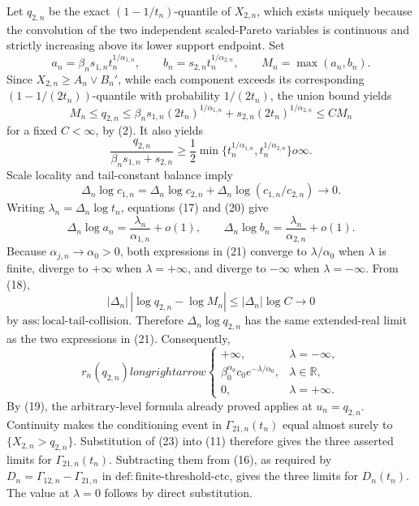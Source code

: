 Let \(q_{2,n}\) be the exact \((1-1/t_n)\)-quantile of \(X_{2,n}\), which exists uniquely because the convolution of the two independent scaled-Pareto variables is continuous and strictly increasing above its lower support endpoint. Set
\[
a_n=\beta_ns_{1,n}t_n^{1/\alpha_{1,n}},
\qquad b_n=s_{2,n}t_n^{1/\alpha_{2,n}},
\qquad M_n=\max(a_n,b_n).
\tag{17}
\]
Since \(X_{2,n}\geq A_n\vee B_n'\), while each component exceeds its corresponding \((1-1/(2t_n))\)-quantile with probability \(1/(2t_n)\), the union bound yields
\[
M_n\leq q_{2,n}
\leq\beta_ns_{1,n}(2t_n)^{1/\alpha_{1,n}}
+s_{2,n}(2t_n)^{1/\alpha_{2,n}}
\leq C M_n
\tag{18}
\]
for a fixed \(C<\infty\), by (2). It also yields
\[
\frac{q_{2,n}}{\beta_ns_{1,n}+s_{2,n}}
\geq\frac12\min\{t_n^{1/\alpha_{1,n}},t_n^{1/\alpha_{2,n}}\}  o\infty.
\tag{19}
\]
Scale locality and tail-constant balance imply
\[
\Delta_n\log c_{1,n}
=\Delta_n\log c_{2,n}+\Delta_n\log(c_{1,n}/c_{2,n})\to0.
\tag{20}
\]
Writing \(\lambda_n=\Delta_n\log t_n\), equations (17) and (20) give
\[
\Delta_n\log a_n=\frac{\lambda_n}{\alpha_{1,n}}+o(1),
\qquad
\Delta_n\log b_n=\frac{\lambda_n}{\alpha_{2,n}}+o(1).
\tag{21}
\]
Because \(\alpha_{j,n}\to\alpha_0>0\), both expressions in (21) converge to \(\lambda/\alpha_0\) when \(\lambda\) is finite, diverge to \(+\infty\) when \(\lambda=+\infty\), and diverge to \(-\infty\) when \(\lambda=-\infty\). From (18),
\[
|\Delta_n|\,|\log q_{2,n}-\log M_n|
\leq |\Delta_n|\log C\to0
\tag{22}
\]
by \(\mathrm{ass{:}local\text{-}tail\text{-}collision}\). Therefore \(\Delta_n\log q_{2,n}\) has the same extended-real limit as the two expressions in (21). Consequently,
\[
r_n(q_{2,n})longrightarrow
\begin{cases}
+\infty, & \lambda=-\infty,\\
\beta_0^{\alpha_0}c_0e^{-\lambda/\alpha_0}, & \lambda\in\mathbb R,\\
0, & \lambda=+\infty.
\end{cases}
\tag{23}
\]
By (19), the arbitrary-level formula already proved applies at \(u_n=q_{2,n}\). Continuity makes the conditioning event in \(\Gamma_{21,n}(t_n)\) equal almost surely to \(\{X_{2,n}>q_{2,n}\}\). Substitution of (23) into (11) therefore gives the three asserted limits for \(\Gamma_{21,n}(t_n)\). Subtracting them from (16), as required by \(D_n=\Gamma_{12,n}-\Gamma_{21,n}\) in \(\mathrm{def{:}finite\text{-}threshold\text{-}ctc}\), gives the three limits for \(D_n(t_n)\). The value at \(\lambda=0\) follows by direct substitution.